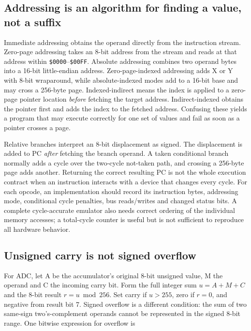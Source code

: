 \subsection{Addressing is an algorithm for finding a value, not a suffix}\label{01-foundations-i-ch016-addressing-is-an-algorithm-for-finding-a-value-not-a-suffix}

Immediate addressing obtains the operand directly from the instruction stream. Zero-page addressing takes an 8-bit address from the stream and reads at that address within \texttt{\$0000}--\texttt{\$00FF}. Absolute addressing combines two operand bytes into a 16-bit little-endian address. Zero-page-indexed addressing adds X or Y with 8-bit wraparound, while absolute-indexed modes add to a 16-bit base and may cross a 256-byte page. Indexed-indirect means the index is applied to a zero-page pointer location \emph{before} fetching the target address. Indirect-indexed obtains the pointer first and adds the index to the fetched address. Confusing these yields a program that may execute correctly for one set of values and fail as soon as a pointer crosses a page.

Relative branches interpret an 8-bit displacement as signed. The displacement is added to PC \emph{after} fetching the branch operand. A taken conditional branch normally adds a cycle over the two-cycle not-taken path, and crossing a 256-byte page adds another. Returning the correct resulting PC is not the whole execution contract when an instruction interacts with a device that changes every cycle. For each opcode, an implementation should record its instruction bytes, addressing mode, conditional cycle penalties, bus reads/writes and changed status bits. A complete cycle-accurate emulator also needs correct ordering of the individual memory accesses; a total-cycle counter is useful but is not sufficient to reproduce all hardware behavior.

\subsection{Unsigned carry is not signed overflow}\label{01-foundations-i-ch016-unsigned-carry-is-not-signed-overflow}

For ADC, let A be the accumulator's original 8-bit unsigned value, M the operand and C the incoming carry bit. Form the full integer sum \(u=A+M+C\) and the 8-bit result \(r=u\bmod256\). Set carry if \(u>255\), zero if \(r=0\), and negative from result bit 7. Signed overflow is a different condition: the sum of two same-sign two's-complement operands cannot be represented in the signed 8-bit range. One bitwise expression for overflow is

